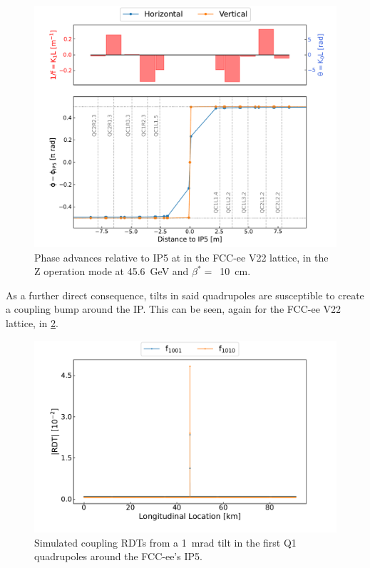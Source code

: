 \begin{figure}[!htb]
    \centering
    \includegraphics*[width=\textwidth]{Figures/IR_Coupling_Correction/fccee_phases_to_ip5.pdf}
    \caption{Phase advances relative to IP\num{5} at in the FCC-ee V22 lattice, in the Z operation mode at \qty{45.6}{\giga\electronvolt} and \(\beta^{\ast}=\)~\qty{10}{\centi\meter}.}
    \label{figure:fccee_phases_to_ip5}
\end{figure}

As a further direct consequence, tilts in said quadrupoles are susceptible to create a coupling bump around the IP.
This can be seen, again for the FCC-ee V\num{22} lattice, in \cref{figure:fccee_ip5_coupling_bump}.

\begin{figure}[!htb]
    \centering
    \includegraphics*[width=\textwidth]{Figures/IR_Coupling_Correction/fccee_ip5_coupling_bump.pdf}
    \caption{Simulated coupling RDTs from a \qty{1}{\milli\radian} tilt in the first Q\num{1} quadrupoles around the FCC-ee's IP\num{5}.}
    \label{figure:fccee_ip5_coupling_bump}
\end{figure}

